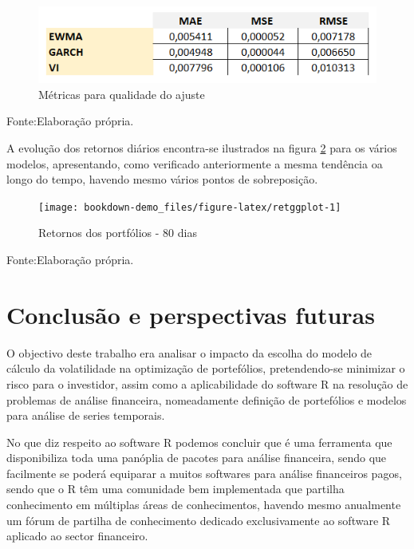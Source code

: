 \documentclass[
  12pt,
  a4paper,
  openany]{book}
\theoremstyle{definition}
\theoremstyle{definition}
\theoremstyle{definition}
\theoremstyle{remark}
\begin{document}
\begin{figure}

{\centering \includegraphics[width=0.8\linewidth]{image/mae} 

}

\caption{Métricas para qualidade do ajuste}\label{fig:mae}
\end{figure}
\FloatBarrier
\centering

Fonte:Elaboração própria.

\justifying
\bigskip

A evolução dos retornos diários encontra-se ilustrados na figura \ref{fig:retggplot} para os vários modelos, apresentando, como verificado anteriormente a mesma tendência oa longo do tempo, havendo mesmo vários pontos de sobreposição.

\begin{figure}

{\centering \texttt{[image: bookdown-demo\_files/figure-latex/retggplot-1]} 

}

\caption{Retornos dos portfólios - 80 dias}\label{fig:retggplot}
\end{figure}
\FloatBarrier
\centering

Fonte:Elaboração própria.

\justifying
\bigskip

\hypertarget{conclusuxe3o-e-perspectivas-futuras}{%
\chapter*{Conclusão e perspectivas futuras}\label{conclusuxe3o-e-perspectivas-futuras}}

O objectivo deste trabalho era analisar o impacto da escolha do modelo de cálculo da volatilidade na optimização de portefólios, pretendendo-se minimizar o risco para o investidor, assim como a aplicabilidade do software R na resolução de problemas de análise financeira, nomeadamente definição de portefólios e modelos para análise de series temporais.

No que diz respeito ao software R podemos concluir que é uma ferramenta que disponibiliza toda uma panóplia de pacotes para análise financeira, sendo que facilmente se poderá equiparar a muitos softwares para análise financeiros pagos, sendo que o R têm uma comunidade bem implementada que partilha conhecimento em múltiplas áreas de conhecimentos, havendo mesmo anualmente um fórum de partilha de conhecimento dedicado exclusivamente ao software R aplicado ao sector financeiro.
\end{document}
